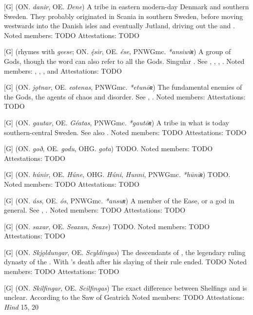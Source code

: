 \begin{itemize}

[G] (ON. \emph{danir}, OE. \emph{Dene})
  A tribe in eastern modern-day Denmark and southern Sweden. They probably originated in Scania in southern Sweden, before moving westwards into the Danish isles and eventually Jutland, driving out the  and .
  Noted members: TODO
  Attestations: TODO

[G] (rhymes with \emph{geese}; ON. \emph{ę́sir}, OE. \emph{ése}, PNWGmc. \emph{*ansiwiʀ})
  A group of Gods, though the word can also refer to all the Gods. Singular . See , , , .
  Noted members: , , ,  and 
  Attestations: TODO

[G] (ON. \emph{jǫtnar}, OE. \emph{eotenas}, PNWGmc. \emph{*etunōʀ})
  The fundamental enemies of the Gods, the agents of chaos and disorder. See , .
  Noted members: 
  Attestations: TODO

[G] (ON. \emph{gautar}, OE. \emph{Géatas}, PNWGmc. \emph{*gautōʀ})
  A tribe in what is today southern-central Sweden. See also .
  Noted members: TODO
  Attestations: TODO

[G] (ON. \emph{goð}, OE. \emph{godu}, OHG. \emph{gota})
  TODO.
  Noted members: TODO
  Attestations: TODO

[G] (ON. \emph{húnir}, OE. \emph{Húne}, OHG. \emph{Húni}, \emph{Hunni}, PNWGmc. \emph{*hūnīʀ})
  TODO.
  Noted members: TODO
  Attestations: TODO

[G] (ON. \emph{áss}, OE. \emph{ós}, PNWGmc. \emph{*ansuʀ})
  A member of the Ease, or a god in general. See , .
  Noted members: TODO
  Attestations: TODO

[G] (ON. \emph{saxar}, OE. \emph{Seaxan}, \emph{Seaxe})
  TODO.
  Noted members: TODO
  Attestations: TODO

[G] (ON. \emph{Skjǫldungar}, OE. \emph{Scyldingas})
  The descendants of , the legendary ruling dynasty of the . With 's death after his slaying of  their rule ended. TODO
  Noted members: TODO
  Attestations: TODO

[G] (ON. \emph{Skilfingar}, OE. \emph{Scilfingas})
  The exact difference between Shelfings and  is unclear. According to the Saw of Geatrich
  Noted members: TODO
  Attestations: \emph{Hind} 15, 20


\end{itemize}
